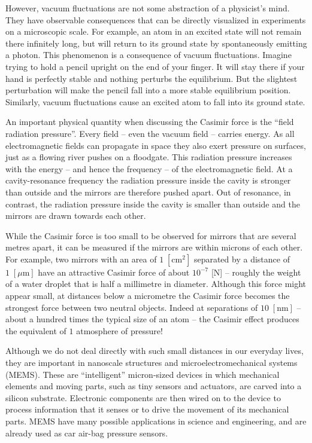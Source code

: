 	However, vacuum fluctuations are not some abstraction of a physicist's mind. They have observable consequences that can be directly visualized in experiments on a microscopic scale. For example, an atom in an excited state will not remain there infinitely long, but will return to its ground state by spontaneously emitting a photon. This phenomenon is a consequence of vacuum fluctuations. Imagine trying to hold a pencil upright on the end of your finger. It will stay there if your hand is perfectly stable and nothing perturbs the equilibrium. But the slightest perturbation will make the pencil fall into a more stable equilibrium position. Similarly, vacuum fluctuations cause an excited atom to fall into its ground state.
	
	An important physical quantity when discussing the Casimir force is the “field radiation pressure”. Every field – even the vacuum field – carries energy. As all electromagnetic fields can propagate in space they also exert pressure on surfaces, just as a flowing river pushes on a floodgate. This radiation pressure increases with the energy – and hence the frequency – of the electromagnetic field. At a cavity-resonance frequency the radiation pressure inside the cavity is stronger than outside and the mirrors are therefore pushed apart. Out of resonance, in contrast, the radiation pressure inside the cavity is smaller than outside and the mirrors are drawn towards each other.
	
	While the Casimir force is too small to be observed for mirrors that are several metres apart, it can be measured if the mirrors are within microns of each other. For example, two mirrors with an area of $1\;[\text{cm}^2]$ separated by a distance of $1\;[\mu\text{m}]$ have an attractive Casimir force of about $10^{-7}$ [N] – roughly the weight of a water droplet that is half a millimetre in diameter. Although this force might appear small, at distances below a micrometre the Casimir force becomes the strongest force between two neutral objects. Indeed at separations of $10\; [\text{nm}]$ – about a hundred times the typical size of an atom – the Casimir effect produces the equivalent of $1$ atmosphere of pressure!
	
	Although we do not deal directly with such small distances in our everyday lives, they are important in nanoscale structures and microelectromechanical systems (MEMS). These are “intelligent” micron-sized devices in which mechanical elements and moving parts, such as tiny sensors and actuators, are carved into a silicon substrate. Electronic components are then wired on to the device to process information that it senses or to drive the movement of its mechanical parts. MEMS have many possible applications in science and engineering, and are already used as car air-bag pressure sensors.
	
